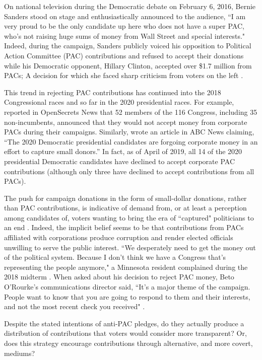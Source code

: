 \documentclass[12pt]{article}
\begin{document}
On national television during the Democratic debate on February 6, 2016, Bernie Sanders stood on stage and enthusiastically announced to the audience, ``I am very proud to be the only candidate up here who does not have a super PAC, who’s not raising huge sums of money from Wall Street and special interests." Indeed, during the campaign, Sanders publicly voiced his opposition to Political Action Committee (PAC) contributions and refused to accept their donations while his Democratic opponent, Hillary Clinton, accepted over \$1.7 million from PACs; A decision for which she faced sharp criticism from voters on the left \citep{seitz-wald2015, yeheelee2016, bump2016, harper2019}. 

This trend in rejecting PAC contributions has continued into the 2018 Congressional races and so far in the 2020 presidential races. For example, \citet{evers-hillstrom2018} reported in OpenSecrets News that 52 members of the 116 Congress, including 35 non-incumbents, announced that they would not accept money from corporate PACs during their campaigns. Similarly,  wrote an article in ABC News claiming, ``The 2020 Democratic presidential candidates are forgoing corporate money in an effort to capture small donors.'' In fact, as of April of 2019, all 14 of the 2020 presidential Democratic candidates have declined to accept corporate PAC contributions (although only three have declined to accept contributions from all PACs). 

The push for campaign donations in the form of small-dollar donations, rather than PAC contributions, is indicative of demand from, or at least a perception among candidates of, voters wanting to bring the era of ``captured" politicians to an end \citep{culberson2019}. Indeed, the implicit belief seems to be that contributions from PACs affiliated with corporations produce corruption and render elected officials unwilling to serve the public interest. ``We desperately need to get the money out of the political system. Because I don’t think we have a Congress that’s representing the people anymore," a Minnesota resident complained during the 2018 midterm \citep{stockman2018}. When asked about his decision to reject PAC money, Beto O’Rourke's communications director said, ``It’s a major theme of the campaign. People want to know that you are going to respond to them and their interests, and not the most recent check you received" \citep{stockman2018}. 

Despite the stated intentions of anti-PAC pledges, do they actually produce a distribution of contributions that voters would consider more transparent? Or, does this strategy encourage contributions through alternative, and more covert, mediums? 
\end{document}
